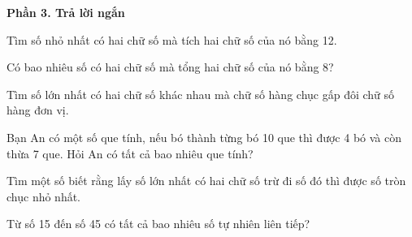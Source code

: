 \textbf{Phần 3. Trả lời ngắn}

\begin{ex} %
Tìm số nhỏ nhất có hai chữ số mà tích hai chữ số của nó bằng 12.
\end{ex}

\begin{ex} %
Có bao nhiêu số có hai chữ số mà tổng hai chữ số của nó bằng 8?
\end{ex}

\begin{ex} %
Tìm số lớn nhất có hai chữ số khác nhau mà chữ số hàng chục gấp đôi chữ số hàng đơn vị.
\end{ex}

\begin{ex} %
Bạn An có một số que tính, nếu bó thành từng bó 10 que thì được 4 bó và còn thừa 7 que. Hỏi An có tất cả bao nhiêu que tính?
\end{ex}

\begin{ex} %
Tìm một số biết rằng lấy số lớn nhất có hai chữ số trừ đi số đó thì được số tròn chục nhỏ nhất.
\end{ex}

\begin{ex} %
Từ số 15 đến số 45 có tất cả bao nhiêu số tự nhiên liên tiếp?
\end{ex}
